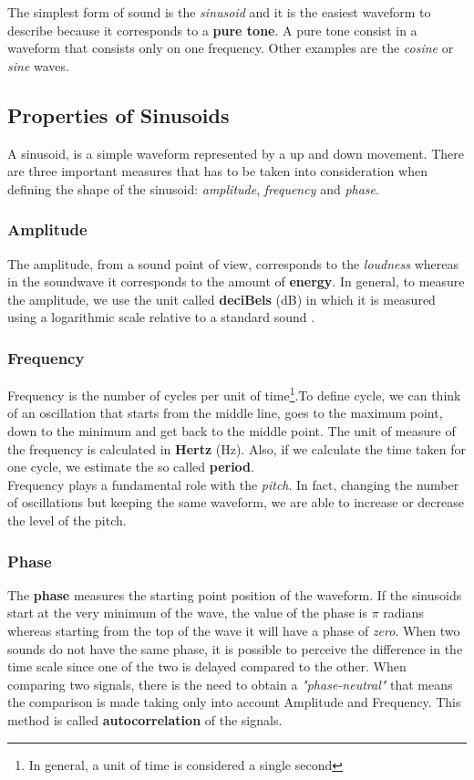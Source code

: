 \noindent The simplest form of sound is the \textit{sinusoid} and it is the easiest waveform to describe because it corresponds to a \textbf{pure tone}. A pure tone consist in a waveform that consists only on one frequency. Other examples are the \textit{cosine} or \textit{sine} waves.

\subsection{Properties of Sinusoids}
\label{sub:prop_of_sinusoids}
A sinusoid, is a simple waveform represented by a up and down movement. There are three important measures that has to be taken into consideration when defining the shape of the sinusoid: \textit{amplitude}, \textit{frequency} and \textit{phase}. 

\subsubsection{Amplitude}
The amplitude, from a sound point of view, corresponds to the \textit{loudness} whereas in the soundwave it corresponds to the amount of \textbf{energy}. In general, to measure the amplitude, we use the unit called \textbf{deciBels} (dB) in which it is measured using a logarithmic scale relative to a standard sound \cite{prop_of_sinusoids}.

\subsubsection{Frequency}
Frequency is the number of cycles per unit of time\footnote{In general, a unit of time is considered a single second}.To define cycle, we can think of an oscillation that starts from the middle line, goes to the maximum point, down to the minimum and get back to the middle point. The unit of measure of the frequency is calculated in \textbf{Hertz} (Hz). Also, if we calculate the time taken for one cycle, we estimate the so called \textbf{period}. \\ 
\noindent Frequency plays a fundamental role with the \textit{pitch}. In fact, changing the number of oscillations but keeping the same waveform, we are able to increase or decrease the level of the pitch.

\subsubsection{Phase}
The \textbf{phase} measures the starting point position of the waveform. If the sinusoids start at the very minimum of the wave, the value of the phase is $\pi$ radians whereas starting from the top of the wave it will have a phase of \textit{zero}. When two sounds do not have the same phase, it is possible to perceive the difference in the time scale since one of the two is delayed compared to the other. When comparing two signals, there is the need to obtain a \textit{"phase-neutral"} that means the comparison is made taking only into account Amplitude and Frequency. This method is called \textbf{autocorrelation} of the signals.

